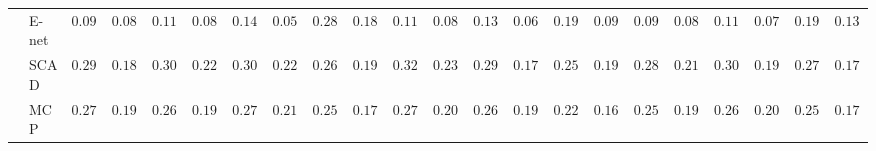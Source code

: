 \begin{tabular}{p{0.2cm}p{1cm}|p{0.6cm}p{0.6cm}|p{0.6cm}p{0.6cm}p{0.6cm}p{0.6cm}p{0.6cm}p{0.6cm}|p{0.6cm}p{0.6cm}p{0.6cm}p{0.6cm}p{0.6cm}p{0.6cm}|p{0.6cm}p{0.6cm}p{0.6cm}p{0.6cm}p{0.6cm}p{0.6cm}}
 & E-net  & $0.0933$ & $0.0831$ & $0.1167$ & $0.0870$ & $0.1483$ & $0.0575$ & $0.2800$ & $0.1848$ & $0.1167$ & $0.0803$ & $0.1367$ & $0.0686$ & $0.1917$ & $0.0959$ & $0.0983$ & $0.0824$ & $0.1167$ & $0.0768$ & $0.1933$ & $0.1396$ \\
 & SCAD  & $0.2900$ & $0.1889$ & $0.3083$ & $0.2277$ & $0.3017$ & $0.2231$ & $0.2617$ & $0.1943$ & $0.3233$ & $0.2343$ & $0.2967$ & $0.1798$ & $0.2517$ & $0.1932$ & $0.2850$ & $0.2123$ & $0.3000$ & $0.1953$ & $0.2700$ & $0.1753$ \\
 & MCP  & $0.2750$ & $0.1973$ & $0.2633$ & $0.1985$ & $0.2700$ & $0.2116$ & $0.2567$ & $0.1795$ & $0.2783$ & $0.2052$ & $0.2633$ & $0.1927$ & $0.2283$ & $0.1601$ & $0.2567$ & $0.1988$ & $0.2683$ & $0.2023$ & $0.2517$ & $0.1716$ \\
\hline 
\end{tabular}

